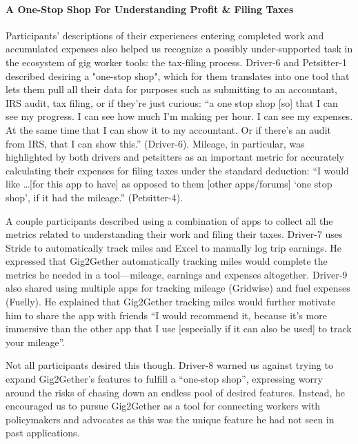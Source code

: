 \paragraph{\textbf{A One-Stop Shop {For Understanding Profit \& Filing Taxes}}}
{Participants' descriptions of their experiences entering completed work and accumulated expenses also helped us recognize a possibly under-supported task in the ecosystem of gig worker tools: the tax-filing process.}
Driver-6 and Petsitter-1 {described desiring a "one-stop shop", which for them} translates into {one tool that lets them} pull all their data for purposes such as submitting to an accountant, IRS audit, tax filing, or if they're just curious:
``a one stop shop [so] that I can see my progress. I can see how much I'm making per hour. I can see my expenses. At the same time that I can show it to my accountant. Or if there's an audit from IRS, that I can show this.'' (Driver-6). Mileage, in particular, {was highlighted by both drivers and petsitters as an important metric for accurately calculating their expenses for filing taxes under the standard deduction:} ``I would like \dots [for this app to have] as opposed to them [other apps/forums] `one stop shop', if it had the mileage.'' (Petsitter-4).

{A couple participants described using a combination of apps to collect all the metrics related to understanding their work and filing their taxes.} Driver-7 uses {Stride to automatically track miles and Excel to manually log trip earnings.} 
{He expressed that Gig2Gether automatically} tracking miles would {complete the metrics} he needed {in a tool}---mileage, earnings and expenses altogether. 
{Driver-9 also shared using multiple apps for tracking mileage (Gridwise) and fuel expenses (Fuelly). He explained that Gig2Gether tracking miles} would further motivate him to share the app with friends ``I would recommend it, because it's more immersive than the other app that I use [especially if it can also be used] to track your mileage''.

{Not all participants desired this though.} Driver-8 warned us against trying to {expand Gig2Gether's features to fulfill} a ``one-stop shop'', {expressing worry around the} risks of chasing down an {endless} pool of desired features. Instead, he encouraged us to pursue Gig2Gether as a tool for connecting workers with policymakers and advocates as this was the unique feature he had not seen in past applications.
